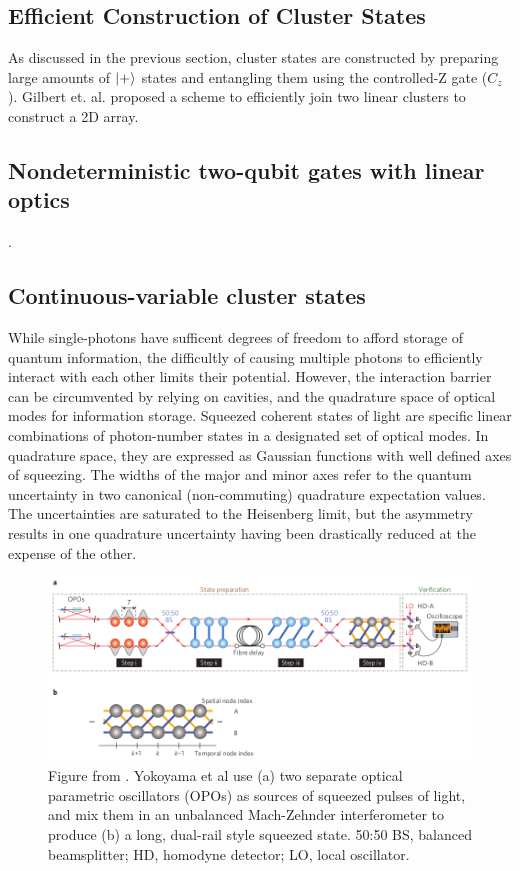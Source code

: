 \documentclass[twocolumn]{Styles/IEEEtran11}
\begin{document}
\subsection{Efficient Construction of Cluster States}
As discussed in the previous section, cluster states are constructed by preparing large amounts of $\left|\mspace{0.5mu} + \mspace{0.5mu}\right\rangle$ states and entangling them using the controlled-Z gate ($C_{z}$). Gilbert et. al. proposed a scheme to efficiently join two linear clusters to construct a 2D array. 

\subsection{Nondeterministic two-qubit gates with linear optics}

\cite{klm2000}.

\subsection{Continuous-variable cluster states}

While single-photons have sufficent degrees of freedom to afford storage of quantum information, the difficultly of causing multiple photons to efficiently interact with each other limits their potential. However, the interaction barrier can be circumvented by relying on cavities, and the quadrature space of optical modes for information storage. Squeezed coherent states of light \cite{lvovsky2014} are specific linear combinations of photon-number states in a designated set of optical modes. In quadrature space, they are expressed as Gaussian functions with well defined axes of squeezing. The widths of the major and minor axes refer to the quantum uncertainty in two canonical (non-commuting) quadrature expectation values. The uncertainties are saturated to the Heisenberg limit, but the asymmetry results in one quadrature uncertainty having been drastically reduced at the expense of the other.

\begin{figure}[t]
  \centering
  \includegraphics[width=\linewidth]{Images/squeezed01.png}
  \caption{Figure from \protect\cite{furusawa2013}. Yokoyama et al use (a) two separate optical parametric oscillators (OPOs) as sources of squeezed pulses of light, and mix them in an unbalanced Mach-Zehnder interferometer to produce (b) a long, dual-rail style squeezed state. 50:50 BS, balanced beamsplitter; HD, homodyne detector; LO, local oscillator.}
  \label{squeezedfig1}
\end{figure}
\end{document}
